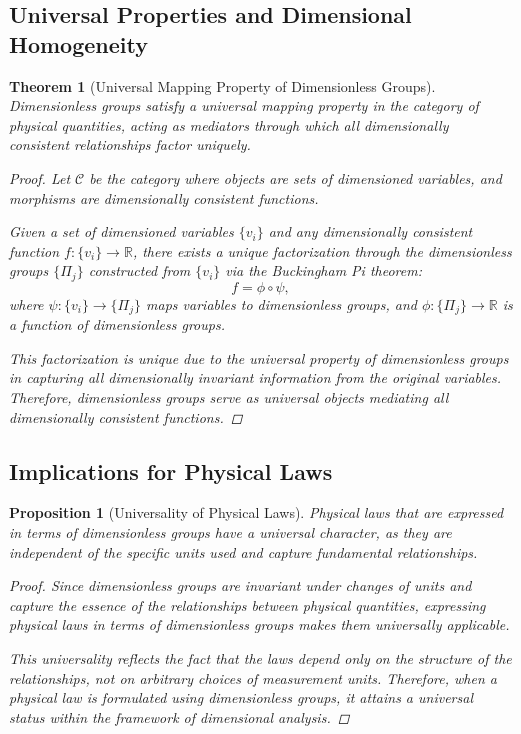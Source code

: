 \documentclass{article}
\newtheorem{theorem}{Theorem}[section]
\newtheorem{proposition}{Proposition}[section]
\theoremstyle{definition}
\theoremstyle{remark}
\begin{document}
	\subsection{Universal Properties and Dimensional Homogeneity}
	
	\begin{theorem}[Universal Mapping Property of Dimensionless Groups]
		Dimensionless groups satisfy a universal mapping property in the category of physical quantities, acting as mediators through which all dimensionally consistent relationships factor uniquely.
		
		\begin{proof}
			Let $\mathcal{C}$ be the category where objects are sets of dimensioned variables, and morphisms are dimensionally consistent functions.
			
			Given a set of dimensioned variables $\{v_i\}$ and any dimensionally consistent function $f: \{v_i\} \rightarrow \mathbb{R}$, there exists a unique factorization through the dimensionless groups $\{\Pi_j\}$ constructed from $\{v_i\}$ via the Buckingham Pi theorem:
			\[
			f = \phi \circ \psi,
			\]
			where $\psi: \{v_i\} \rightarrow \{\Pi_j\}$ maps variables to dimensionless groups, and $\phi: \{\Pi_j\} \rightarrow \mathbb{R}$ is a function of dimensionless groups.
			
			This factorization is unique due to the universal property of dimensionless groups in capturing all dimensionally invariant information from the original variables. Therefore, dimensionless groups serve as universal objects mediating all dimensionally consistent functions.
		\end{proof}
	\end{theorem}
	
	\subsection{Implications for Physical Laws}
	
	\begin{proposition}[Universality of Physical Laws]
		Physical laws that are expressed in terms of dimensionless groups have a universal character, as they are independent of the specific units used and capture fundamental relationships.
		
		\begin{proof}
			Since dimensionless groups are invariant under changes of units and capture the essence of the relationships between physical quantities, expressing physical laws in terms of dimensionless groups makes them universally applicable.
			
			This universality reflects the fact that the laws depend only on the structure of the relationships, not on arbitrary choices of measurement units. Therefore, when a physical law is formulated using dimensionless groups, it attains a universal status within the framework of dimensional analysis.
		\end{proof}
	\end{proposition}
	
\end{document}
